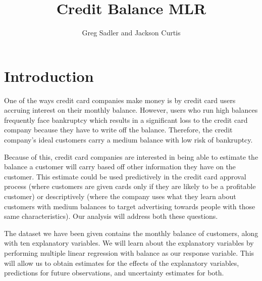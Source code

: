 \documentclass{article}
\begin{document}
        
\title{Credit Balance MLR}


\author{Greg Sadler and Jackson Curtis}
\maketitle 

\section{Introduction}

One of the ways credit card companies make money is by credit card users accruing interest on their monthly balance. However, users who run high balances frequently face bankruptcy which results in a significant loss to the credit card company because they have to write off the balance. Therefore, the credit company's ideal customers carry a medium balance with low risk of bankruptcy. 

Because of this, credit card companies are interested in being able to estimate the balance a customer will carry based off other information they have on the customer. This estimate could be used predictively in the credit card approval process (where customers are given cards only if they are likely to be a profitable customer) or descriptively (where the company uses what they learn about customers with medium balances to target advertising towards people with those same characteristics). Our analysis will address both these questions.

The dataset we have been given contains the monthly balance of customers, along with ten explanatory variables. We will learn about the explanatory variables by performing multiple linear regression with balance as our response variable. This will allow us to obtain estimates for the effects of the explanatory variables, predictions for future observations, and uncertainty estimates for both.
\end{document}
